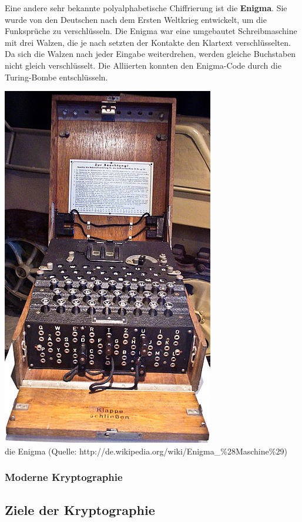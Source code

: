 \documentclass[12pt,a4paper]{report}
\begin{document}
\begin{onehalfspace}
Eine andere sehr bekannte polyalphabetische Chiffrierung ist die \textbf{Enigma}. Sie wurde von den Deutschen nach dem Ersten Weltkrieg entwickelt, um die Funksprüche zu verschlüsseln. Die Enigma war eine umgebautet Schreibmaschine mit drei Walzen, die je nach setzten der Kontakte den Klartext verschlüsselten. Da sich die Walzen nach jeder Eingabe weiterdrehen, werden gleiche Buchstaben nicht gleich verschlüsselt. Die Alliierten konnten den Enigma-Code durch die Turing-Bombe entschlüsseln.

\begin{center}
\includegraphics[scale=2.5]{img/enigma.jpg}\\
die Enigma (Quelle: http://de.wikipedia.org/wiki/Enigma\_\%28Maschine\%29)
\end{center}

\subsubsection{Moderne Kryptographie}

\subsection{Ziele der Kryptographie}


\end{onehalfspace}
\end{document}
